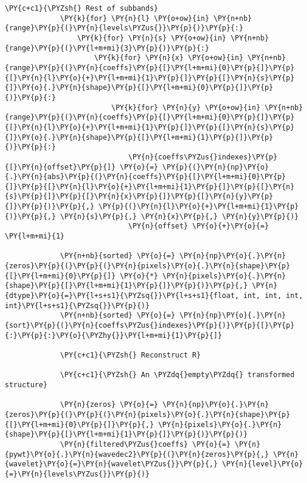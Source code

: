 \begin{Verbatim}[commandchars=\\\{\}]
             \PY{c+c1}{\PYZsh{} Rest of subbands}
             \PY{k}{for} \PY{n}{l} \PY{o+ow}{in} \PY{n+nb}{range}\PY{p}{(}\PY{n}{levels\PYZus{}}\PY{p}{)}\PY{p}{:}
                 \PY{k}{for} \PY{n}{s} \PY{o+ow}{in} \PY{n+nb}{range}\PY{p}{(}\PY{l+m+mi}{3}\PY{p}{)}\PY{p}{:}
                     \PY{k}{for} \PY{n}{x} \PY{o+ow}{in} \PY{n+nb}{range}\PY{p}{(}\PY{n}{coeffs}\PY{p}{[}\PY{l+m+mi}{0}\PY{p}{]}\PY{p}{[}\PY{n}{l}\PY{o}{+}\PY{l+m+mi}{1}\PY{p}{]}\PY{p}{[}\PY{n}{s}\PY{p}{]}\PY{o}{.}\PY{n}{shape}\PY{p}{[}\PY{l+m+mi}{0}\PY{p}{]}\PY{p}{)}\PY{p}{:}
                         \PY{k}{for} \PY{n}{y} \PY{o+ow}{in} \PY{n+nb}{range}\PY{p}{(}\PY{n}{coeffs}\PY{p}{[}\PY{l+m+mi}{0}\PY{p}{]}\PY{p}{[}\PY{n}{l}\PY{o}{+}\PY{l+m+mi}{1}\PY{p}{]}\PY{p}{[}\PY{n}{s}\PY{p}{]}\PY{o}{.}\PY{n}{shape}\PY{p}{[}\PY{l+m+mi}{1}\PY{p}{]}\PY{p}{)}\PY{p}{:}
                             \PY{n}{coeffs\PYZus{}indexes}\PY{p}{[}\PY{n}{offset}\PY{p}{]} \PY{o}{=} \PY{p}{(}\PY{n}{np}\PY{o}{.}\PY{n}{abs}\PY{p}{(}\PY{n}{coeffs}\PY{p}{[}\PY{l+m+mi}{0}\PY{p}{]}\PY{p}{[}\PY{n}{l}\PY{o}{+}\PY{l+m+mi}{1}\PY{p}{]}\PY{p}{[}\PY{n}{s}\PY{p}{]}\PY{p}{[}\PY{n}{x}\PY{p}{]}\PY{p}{[}\PY{n}{y}\PY{p}{]}\PY{p}{)}\PY{p}{,} \PY{p}{(}\PY{n}{l}\PY{o}{+}\PY{l+m+mi}{1}\PY{p}{)}\PY{p}{,} \PY{n}{s}\PY{p}{,} \PY{n}{x}\PY{p}{,} \PY{n}{y}\PY{p}{)}
                             \PY{n}{offset} \PY{o}{+}\PY{o}{=} \PY{l+m+mi}{1}
         
             \PY{n+nb}{sorted} \PY{o}{=} \PY{n}{np}\PY{o}{.}\PY{n}{zeros}\PY{p}{(}\PY{p}{(}\PY{n}{pixels}\PY{o}{.}\PY{n}{shape}\PY{p}{[}\PY{l+m+mi}{0}\PY{p}{]} \PY{o}{*} \PY{n}{pixels}\PY{o}{.}\PY{n}{shape}\PY{p}{[}\PY{l+m+mi}{1}\PY{p}{]}\PY{p}{)}\PY{p}{,} \PY{n}{dtype}\PY{o}{=}\PY{l+s+s1}{\PYZsq{}}\PY{l+s+s1}{float, int, int, int, int}\PY{l+s+s1}{\PYZsq{}}\PY{p}{)}
             \PY{n+nb}{sorted} \PY{o}{=} \PY{n}{np}\PY{o}{.}\PY{n}{sort}\PY{p}{(}\PY{n}{coeffs\PYZus{}indexes}\PY{p}{)}\PY{p}{[}\PY{p}{:}\PY{p}{:}\PY{o}{\PYZhy{}}\PY{l+m+mi}{1}\PY{p}{]}
         
             \PY{c+c1}{\PYZsh{} Reconstruct R}
         
             \PY{c+c1}{\PYZsh{} An \PYZdq{}empty\PYZdq{} transformed structure}
         
             \PY{n}{zeros} \PY{o}{=} \PY{n}{np}\PY{o}{.}\PY{n}{zeros}\PY{p}{(}\PY{p}{(}\PY{n}{pixels}\PY{o}{.}\PY{n}{shape}\PY{p}{[}\PY{l+m+mi}{0}\PY{p}{]}\PY{p}{,} \PY{n}{pixels}\PY{o}{.}\PY{n}{shape}\PY{p}{[}\PY{l+m+mi}{1}\PY{p}{]}\PY{p}{)}\PY{p}{)}
             \PY{n}{filtered\PYZus{}coeffs} \PY{o}{=} \PY{n}{pywt}\PY{o}{.}\PY{n}{wavedec2}\PY{p}{(}\PY{n}{zeros}\PY{p}{,} \PY{n}{wavelet}\PY{o}{=}\PY{n}{wavelet\PYZus{}}\PY{p}{,} \PY{n}{level}\PY{o}{=}\PY{n}{levels\PYZus{}}\PY{p}{)}
         

\end{Verbatim}
